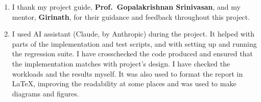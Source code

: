 \documentclass[11pt,a4paper]{article}
\begin{document}
\begin{enumerate}
    \item I thank my project guide, \textbf{Prof.\ Gopalakrishnan Srinivasan},
    and my mentor, \textbf{Girinath}, for their guidance and feedback
    throughout this project.

    \item I used AI assistant (Claude, by Anthropic) during the
    project. It helped with parts of the implementation and test
    scripts, and with setting up and running the regression suite. I have crosschecked the code produced and ensured that the implementation matches with project's design. I have checked the workloads and the results myself. It
    was also used to format the report in \LaTeX{}, improving the readability at some places and was used to make
    diagrams and figures.
\end{enumerate}



\end{document}

